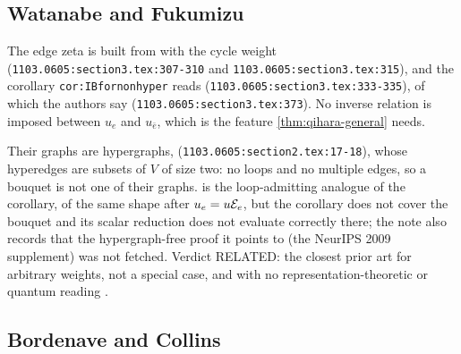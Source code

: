 \subsection{Watanabe and Fukumizu}

\begin{citedfact}
\label{cit:wf-arbitrary-weights}
\sloppy
The edge zeta is built from
{\small\texttt{}}
with the cycle weight
{\small\texttt{}}
(\texttt{1103.0605:section3.tex:307-310} and
\texttt{1103.0605:section3.tex:315}), and the corollary
\texttt{cor:IBfornonhyper} reads
{\small\texttt{}}
(\texttt{1103.0605:section3.tex:333-335}), of which the authors say
{\small\texttt{}}
(\texttt{1103.0605:section3.tex:373}). No inverse relation is imposed between
$u_e$ and $u_{\bar e}$, which is the feature \cref{thm:qihara-general} needs.
\end{citedfact}

\begin{sloppypar}Their graphs are hypergraphs,
{\small\texttt{}}
(\texttt{1103.0605:section2.tex:17-18}), whose hyperedges are subsets of $V$
of size two: no loops and no multiple edges, so a bouquet is not one of their
graphs.  is the loop-admitting analogue of the
corollary, of the same shape after $u_e = u\mathcal E_{e}$, but the corollary does
not cover the bouquet and its scalar reduction does not evaluate correctly
there; the note also records that the hypergraph-free proof it points to (the
NeurIPS 2009 supplement) was not fetched. Verdict RELATED: the closest prior
art for arbitrary weights, not a special case, and with no
representation-theoretic or quantum reading \cite{watanabe2011zeta}.\end{sloppypar}

\subsection{Bordenave and Collins}

